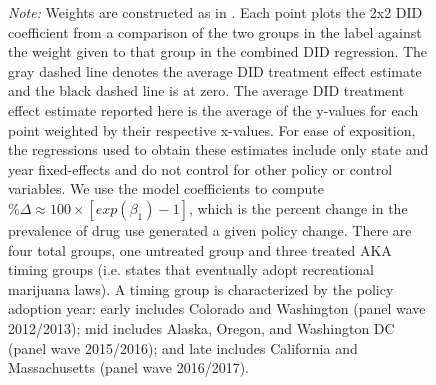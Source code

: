 \documentclass[12pt]{article}%
\begin{document}
\begin{appendices}
\begin{figure}
\begin{minipage}{.9\linewidth}
\begin{subfigure}[b]{0.32\columnwidth}
  \end{subfigure}
      \label{fig:bacon_lead_lag_mj}
         \begin{justify}
                {\footnotesize
                    \emph{Note:} 
            Weights are constructed as in \citep{Goodman-Bacon2018}.
            Each point plots the 2x2 DID coefficient from a comparison of the two groups in the label against the weight given to that group in the combined DID regression.
            The gray dashed line denotes the average DID treatment effect estimate and the black dashed line is at zero.
            The average DID treatment effect estimate reported here is the average of the y-values for each point weighted by their respective x-values.
            For ease of exposition, the regressions used to obtain these estimates include only state and year fixed-effects and do not control for other policy or control variables.
             We use the model coefficients to compute $\% \Delta \approx 100\times \left[exp(\beta_1)-1\right]$, which is the percent change in the prevalence of drug use generated a given policy change.    
                There are four total groups, one untreated group and three treated AKA timing groups (i.e. states that eventually adopt recreational marijuana laws).
            A timing group is characterized by the policy adoption year:
            early includes Colorado and Washington (panel wave 2012/2013);
            mid includes Alaska, Oregon, and Washington DC (panel wave 2015/2016);
            and late includes California and Massachusetts (panel wave 2016/2017).
                \par}
            \end{justify}
  \end{minipage}
\end{figure}

\end{appendices}
\newpage
\FloatBarrier

\setcounter{page}{1}

\renewcommand*{\thepage}{OA\arabic{page}}

\setcounter{table}{0}
\setcounter{figure}{0}

\renewcommand{\thetable}{OA\arabic{table}}
\renewcommand{\thefigure}{OA\arabic{figure}}
\renewcommand{\thesection}{OA.\arabic{section}}
\renewcommand{\thesubsection}{OA.\arabic{subsection}}
\end{document}

